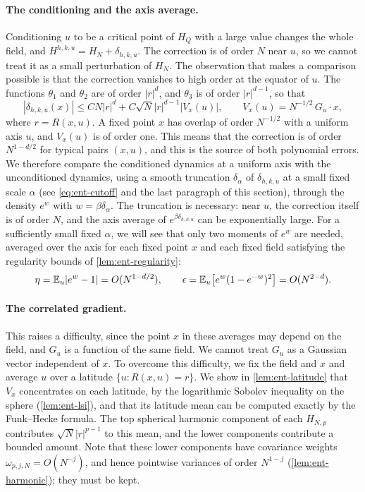 \paragraph{The conditioning and the axis average.}
Conditioning $u$ to be a critical point of $H_Q$ with a large value changes
the whole field, and $H^{h,k,u}=H_N+\delta_{h,k,u}$. The correction is of
order $N$ near $u$, so we cannot treat it as a small perturbation of $H_N$.
The observation that makes a comparison possible is that the correction
vanishes to high order at the equator of $u$. The functions $\theta_1$ and
$\theta_2$ are of order $|r|^d$, and $\theta_3$ is of order $|r|^{d-1}$, so
that
\[
 |\delta_{h,k,u}(x)|\le CN|r|^d+C\sqrt N|r|^{d-1}|V_x(u)|,
 \qquad V_x(u)=N^{-1/2}\,G_u\cdot x,
\]
where $r=R(x,u)$. A fixed point $x$ has overlap of order $N^{-1/2}$ with a
uniform axis $u$, and $V_x(u)$ is of order one. This means that the
correction is of order $N^{1-d/2}$ for typical pairs $(x,u)$, and this is the
source of both polynomial errors. We therefore compare the conditioned
dynamics at a uniform axis with the unconditioned dynamics, using a smooth
truncation $\delta_\alpha$ of $\delta_{h,k,u}$ at a small fixed scale
$\alpha$ (see \eqref{eq:ent-cutoff} and the last paragraph of this section),
through the density $e^w$ with $w=\beta\delta_\alpha$. The truncation is
necessary: near $u$, the correction itself is of order $N$, and the axis
average of $e^{\beta\delta_{h,k,u}}$ can be exponentially large. For a
sufficiently small fixed $\alpha$, we will see that only two moments of
$e^w$ are needed, averaged over the axis for each fixed point $x$ and each
fixed field satisfying the regularity bounds of \cref{lem:ent-regularity}:
\[
 \eta=\mathbb E_u|e^w-1|=O(N^{1-d/2}),\qquad
 \epsilon=\mathbb E_u\bigl[e^w(1-e^{-w})^2\bigr]=O(N^{2-d}).
\]

\paragraph{The correlated gradient.}
This raises a difficulty, since the point $x$ in these averages may depend
on the field, and $G_u$ is a function of the same field. We cannot treat
$G_u$ as a Gaussian vector independent of $x$. To overcome this difficulty,
we fix the field and $x$ and average $u$ over a latitude
$\{u:R(x,u)=r\}$. We show in \cref{lem:ent-latitude} that $V_x$ concentrates
on each latitude, by the logarithmic Sobolev inequality on the sphere
(\cref{lem:ent-lsi}), and that its latitude mean can be computed exactly by
the Funk--Hecke formula. The top spherical harmonic component of each
$H_{N,p}$ contributes $\sqrt N|r|^{p-1}$ to this mean, and the lower
components contribute a bounded amount. Note that these lower components
have covariance weights $\omega_{p,j,N}=O(N^{-j})$, and hence pointwise
variances of order $N^{1-j}$ (\cref{lem:ent-harmonic}); they must be
kept.

